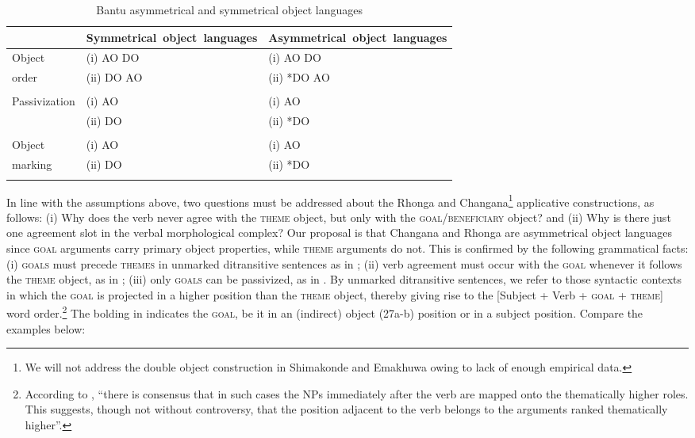 \documentclass[output=paper]{langsci/langscibook}
\begin{document}
\begin{table}
\caption{Bantu asymmetrical and symmetrical object languages}
\label{tab:nguna:3}


\begin{tabularx}{\textwidth}{p{1.8cm}XX}
\lsptoprule
& \mbox{Symmetrical object languages}&\mbox{Asymmetrical object languages}\\
\midrule
 Object & {(i) AO DO} & (i) AO DO\\
 order	& (ii) DO AO  & (ii) *DO AO\\
\\
 
 Passivization& (i) AO & (i) AO\\
	      & (ii) DO&  (ii) *DO\\
 \\
 
 Object & (i) AO &  (i) AO\\
 marking   & (ii) DO&  (ii) *DO\\
\lspbottomrule
\end{tabularx}
\end{table}

In line with the assumptions above, {two questions must be addressed about the Rhonga and Changana}\footnote{ {We will not address the double object construction in Shimakonde and Emakhuwa owing to lack of enough empirical data. }} {applicative constructions, as follows: (i) Why does the verb never agree with the }{\textsc{theme}} {object, but only with the }{\textsc{goal}}{/}{\textsc{beneficiary}} {object? and (ii) Why is there just one agreement slot in the verbal morphological complex? }Our proposal is that Changana and Rhonga are asymmetrical object languages since \textsc{goal} arguments carry primary object properties, while \textsc{theme} arguments do not. This is confirmed by the following grammatical facts: (i) \textsc{goals} must precede \textsc{themes} in unmarked ditransitive sentences as in ; (ii) verb agreement must occur with the \textsc{goal} whenever it follows the \textsc{theme} object, as in ; (iii) only \textsc{goals} can be passivized, as in . By unmarked ditransitive sentences, we refer to those syntactic contexts in which the \textsc{goal} is projected in a higher position than the \textsc{theme} object, thereby giving rise to the [Subject + Verb + \textsc{goal} + \textsc{theme}] word order.\footnote{ {According to \citet[111]{Chimbutane2002}, “there is consensus that in such cases the NPs immediately after the verb are mapped onto the thematically higher roles. This suggests, though not without controversy, that the position adjacent to the verb belongs to the arguments ranked thematically higher”.}} The bolding in  indicates the \textsc{goal}, be it in an (indirect) object (27a-b) position or in a subject  position. Compare the examples below:
\end{document}
